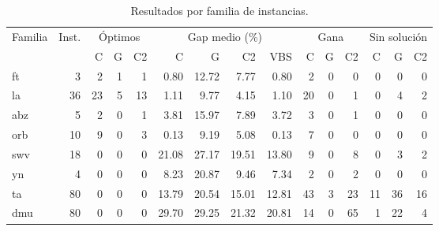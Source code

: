 \begin{table}[H]
  \centering
  \small
  \singlespacing
  \caption{Resultados por familia de instancias.}
  \label{tab:por_familia}
  \begin{tabular}{lrrrrrrrrrrrrrr}
    \toprule
    Familia & Inst. & \multicolumn{3}{c}{Óptimos} & \multicolumn{4}{c}{Gap medio (\%)} & \multicolumn{3}{c}{Gana} & \multicolumn{3}{c}{Sin solución} \\
    \cmidrule(lr){3-5}\cmidrule(lr){6-9}\cmidrule(lr){10-12}\cmidrule(lr){13-15}
     &  & C & G & C2 & C & G & C2 & VBS & C & G & C2 & C & G & C2 \\
    \midrule
    ft & 3 & 2 & 1 & 1 & 0.80 & 12.72 & 7.77 & 0.80 & 2 & 0 & 0 & 0 & 0 & 0 \\
    la & 36 & 23 & 5 & 13 & 1.11 & 9.77 & 4.15 & 1.10 & 20 & 0 & 1 & 0 & 4 & 2 \\
    abz & 5 & 2 & 0 & 1 & 3.81 & 15.97 & 7.89 & 3.72 & 3 & 0 & 1 & 0 & 0 & 0 \\
    orb & 10 & 9 & 0 & 3 & 0.13 & 9.19 & 5.08 & 0.13 & 7 & 0 & 0 & 0 & 0 & 0 \\
    swv & 18 & 0 & 0 & 0 & 21.08 & 27.17 & 19.51 & 13.80 & 9 & 0 & 8 & 0 & 3 & 2 \\
    yn & 4 & 0 & 0 & 0 & 8.23 & 20.87 & 9.46 & 7.34 & 2 & 0 & 2 & 0 & 0 & 0 \\
    ta & 80 & 0 & 0 & 0 & 13.79 & 20.54 & 15.01 & 12.81 & 43 & 3 & 23 & 11 & 36 & 16 \\
    dmu & 80 & 0 & 0 & 0 & 29.70 & 29.25 & 21.32 & 20.81 & 14 & 0 & 65 & 1 & 22 & 4 \\
    \bottomrule
  \end{tabular}
  \par\vspace{2pt}{\footnotesize C: Chuffed; G: Gecode; C2: Chuffed V2.}
\end{table}
